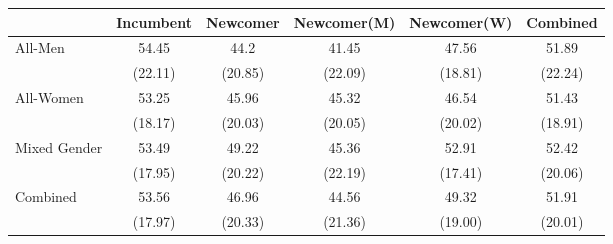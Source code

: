 \begin{tabular}{l*{5}{c}}
\toprule
                & Incumbent & Newcomer & Newcomer(M) & Newcomer(W) &    Combined \\
\midrule
All-Men      & 54.45  & 44.2  &    41.45&    47.56&    51.89\\
                &(22.11) &(20.85)&  (22.09)&  (18.81)&  (22.24)\\
\addlinespace
All-Women&   53.25 &    45.96 &    45.32&    46.54&    51.43\\
                & (18.17) & (20.03)&  (20.05)&  (20.02)&  (18.91)\\
\addlinespace
Mixed Gender     &    53.49&      49.22&    45.36&    52.91&    52.42\\
                &   (17.95)&   (20.22)&  (22.19)&  (17.41)&  (20.06)\\
\addlinespace
Combined &    53.56&     46.96&    44.56&    49.32&    51.91\\
                &  (17.97)&  (20.33)&  (21.36)&  (19.00)&  (20.01)\\

\bottomrule
\end{tabular}

